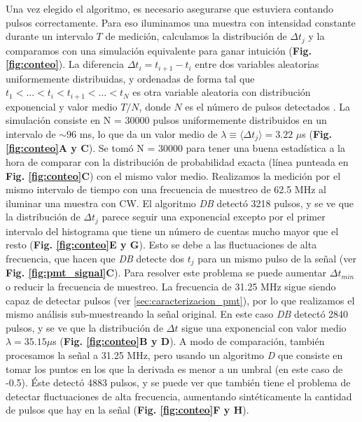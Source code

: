 Una vez elegido el algoritmo, es necesario asegurarse que estuviera contando pulsos correctamente.
Para eso iluminamos una muestra con intensidad constante durante un intervalo $T$ de medición, calculamos la distribución de $\Delta t_j$ y la comparamos con una simulación equivalente para ganar intuición (\textbf{Fig. \ref{fig:conteo}}).
La diferencia $\Delta t_i = t_{i+1} - t_i$ entre dos variables aleatorias uniformemente distribuidas, y ordenadas de forma tal que $t_1 < ... < t_i < t_{i+1} < ... < t_N $ es otra variable aleatoria con distribución exponencial y valor medio $T/N$, donde $N$ es el número de pulsos detectados \cite{dasuniform}.
La simulación consiste en N = 30000 pulsos uniformemente distribuidos en un intervalo de $\sim 96$ ms, lo que da un valor medio de $\lambda \equiv \langle \Delta t_j \rangle = 3.22$ $\mu$s (\textbf{Fig. \ref{fig:conteo}A y C}).
Se tomó N = 30000 para tener una buena estadística a la hora de comparar con la distribución de probabilidad exacta (línea punteada en \textbf{Fig. \ref{fig:conteo}C}) con el mismo valor medio.
Realizamos la medición por el mismo intervalo de tiempo con una frecuencia de muestreo de 62.5 MHz al iluminar una muestra con CW.
El algoritmo \textit{DB} detectó 3218 pulsos, y se ve que la distribución de $\Delta t_j$ parece seguir una exponencial excepto por el primer intervalo del histograma que tiene un número de cuentas mucho mayor que el resto (\textbf{Fig. \ref{fig:conteo}E y G}).
Esto se debe a las fluctuaciones de alta frecuencia, que hacen que \textit{DB} detecte dos $t_j$ para un mismo pulso de la señal (ver \textbf{Fig. \ref{fig:pmt_signal}C}). 
Para resolver este problema se puede aumentar $\Delta t_{min}$ o reducir la frecuencia de muestreo.
La frecuencia de 31.25 MHz sigue siendo capaz de detectar pulsos (ver \ref{sec:caracterizacion_pmt}), por lo que realizamos el mismo análisis sub-muestreando la señal original.
En este caso \textit{DB} detectó 2840 pulsos, y se ve que la distribución de $\Delta t$ sigue una exponencial con valor medio $\lambda = 35.15 \mu$s (\textbf{Fig. \ref{fig:conteo}B y D}).
A modo de comparación, también procesamos la señal a 31.25 MHz, pero usando un algoritmo \textit{D} que consiste en tomar los puntos en los que la derivada es menor a un umbral (en este caso de -0.5).
Éste detectó 4883 pulsos, y se puede ver que también tiene el problema de detectar fluctuaciones de alta frecuencia, aumentando sintéticamente la cantidad de pulsos que hay en la señal (\textbf{Fig. \ref{fig:conteo}F y H}).

